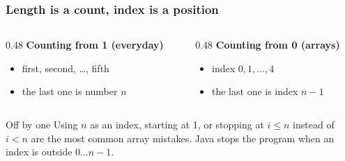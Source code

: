 \documentclass[aspectratio=169,10pt,compress]{beamer}
\begin{document}
\begin{frame}[t,fragile] \frametitle{Length is a count, index is a position}
	\begin{center}
	\end{center}

	\begin{columns}[T]
		\begin{column}{0.48\textwidth}
			\textbf{Counting from 1 (everyday)}
			\begin{itemize}
				\item first, second, \dots, fifth
				\item the last one is number $n$
			\end{itemize}
		\end{column}
		\begin{column}{0.48\textwidth}
			\textbf{Counting from 0 (arrays)}
			\begin{itemize}
				\item index $0, 1, \dots, 4$
				\item the last one is index $n - 1$
			\end{itemize}
		\end{column}
	\end{columns}

	\vspace{0.5em}
	\begin{alertblock}{Off by one}
		Using $n$ as an index, starting at 1, or stopping at $i \le n$ instead of $i < n$
		are the most common array mistakes. Java stops the program when an index is outside
		$0 \dots n - 1$.
	\end{alertblock}
\end{frame}




\end{document}

